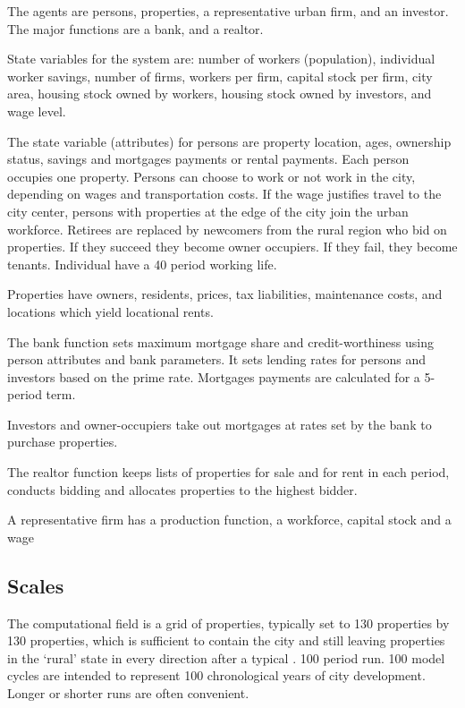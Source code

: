 The agents are persons, properties, a representative urban firm, and an investor. The major functions are a bank, and a realtor. %

State variables for the system are: number of workers (population), individual worker savings, number of firms, workers per firm, capital stock per firm, city area, housing stock owned by workers, housing stock owned by investors, and wage level.

The state variable (attributes) for persons are property location, ages, ownership status, savings and mortgages payments or rental payments. Each person occupies one property. 
Persons can choose to work or not work in the city, depending on wages and transportation costs. If the wage justifies travel to the city center, persons with properties at the edge of the city join the urban workforce. 
Retirees are replaced by newcomers from the rural region who bid on properties. If they succeed they become owner occupiers. If they fail, they become tenants.  Individual have a 40 period working life.  

Properties have owners, residents, prices, tax liabilities, maintenance costs,  and locations which yield  locational rents. 

The bank function sets maximum mortgage share and credit-worthiness using person attributes and bank parameters. It sets lending rates for persons and investors based on the prime rate. Mortgages payments are calculated for a 5-period term.
 
Investors and owner-occupiers take out mortgages at rates set by the bank to purchase properties. 

The realtor function keeps lists of properties for sale and for rent in each period, conducts bidding and allocates properties to the highest bidder.

A representative firm has a production function, a workforce, capital stock and a wage 


\subsection{Scales}

The computational field is a grid of properties, typically set to 130 properties by 130 properties, which is sufficient to contain the city and still leaving properties in the `rural' state in every direction after a typical .
100 period run. 100 model cycles are intended to represent 100 chronological years of city development. Longer or shorter runs are often convenient. 


